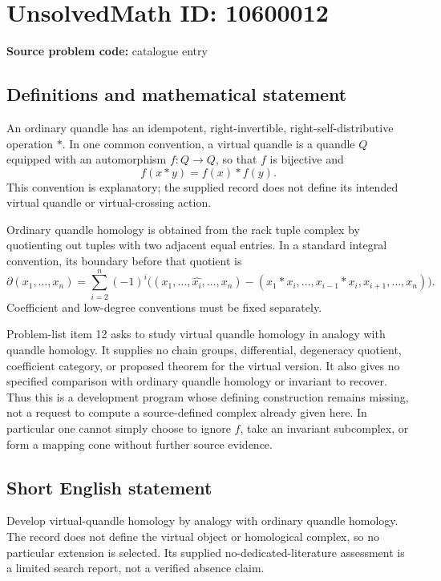 \documentclass[11pt]{article}
\begin{document}
\section*{UnsolvedMath ID: 10600012}
\textbf{Source problem code:} catalogue entry
\subsection{Definitions and mathematical statement}
An ordinary quandle has an idempotent, right-invertible, right-self-distributive operation \(*\). In one common convention, a virtual quandle is a quandle \(Q\) equipped with an automorphism \(f:Q\to Q\), so that \(f\) is bijective and
\[
 f(x*y)=f(x)*f(y).
\]
This convention is explanatory; the supplied record does not define its intended virtual quandle or virtual-crossing action.

Ordinary quandle homology is obtained from the rack tuple complex by quotienting out tuples with two adjacent equal entries. In a standard integral convention, its boundary before that quotient is
\[
 \partial(x_1,\ldots,x_n)=\sum_{i=2}^{n}(-1)^i
 \bigl((x_1,\ldots,\widehat{x_i},\ldots,x_n)
 -(x_1*x_i,\ldots,x_{i-1}*x_i,x_{i+1},\ldots,x_n)\bigr).
\]
Coefficient and low-degree conventions must be fixed separately.

Problem-list item 12 asks to study virtual quandle homology in analogy with quandle homology. It supplies no chain groups, differential, degeneracy quotient, coefficient category, or proposed theorem for the virtual version. It also gives no specified comparison with ordinary quandle homology or invariant to recover. Thus this is a development program whose defining construction remains missing, not a request to compute a source-defined complex already given here. In particular one cannot simply choose to ignore \(f\), take an invariant subcomplex, or form a mapping cone without further source evidence.
\subsection{Short English statement}
Develop virtual-quandle homology by analogy with ordinary quandle homology. The record does not define the virtual object or homological complex, so no particular extension is selected. Its supplied no-dedicated-literature assessment is a limited search report, not a verified absence claim.
\end{document}
